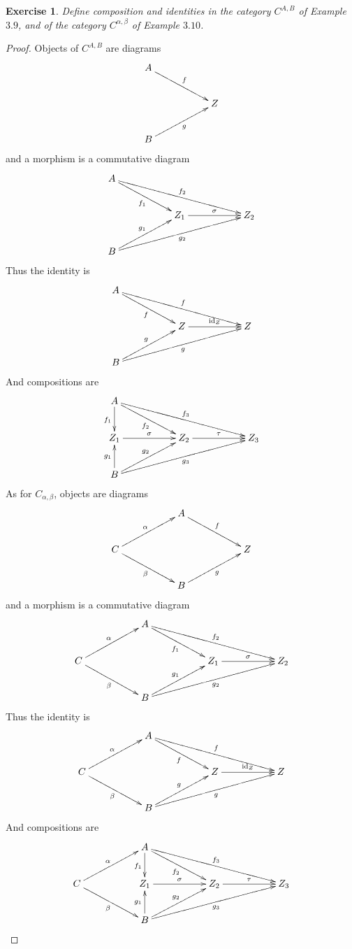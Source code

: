 \documentclass[a4paper, 11pt]{book}
\theoremstyle{plain}
\newtheorem{exercise}[theorem]{Exercise}
\theoremstyle{plain}
\begin{document}
\begin{exercise}
Define composition and identities in the category $C^{A,B}$ of Example $3.9$, and of the category $C^{\alpha,\beta}$ of Example $3.10$.
\end{exercise}
\begin{proof}
Objects of $C^{A,B}$ are diagrams
$$\xymatrix{
A\ar[rrd]^{f}& &\\
 & & Z\\
B\ar[rru]_g& &
}$$
and a morphism is a commutative diagram
$$\xymatrix{
A\ar[rrd]_{f_1}\ar[rrrrd]^{f_2} & & & & \\
& & Z_1\ar[rr]^{\sigma} & & Z_2\\
B\ar[rru]^{g_1}\ar[rrrru]_{g_2} & & & & 
}$$
Thus the identity is
$$\xymatrix{
A\ar[rrd]_{f}\ar[rrrrd]^{f} & & & & \\
& & Z\ar[rr]^{\text{id}_Z}& & Z\\
B\ar[rru]^{g}\ar[rrrru]_{g} & & & & 
}$$
And compositions are
$$\xymatrix{
A\ar[d]_{f_1}\ar[rrd]_{f_2}\ar[rrrrd]^{f_3} & & & & \\
Z_1\ar[rr]^\sigma & & Z_2\ar[rr]^{\tau} & & Z_3\\
B\ar[u]^{g_1}\ar[rru]^{g_2}\ar[rrrru]_{g_3} & & & & 
}$$
As for $C_{\alpha,\beta}$, objects are diagrams
$$\xymatrix{
& & A\ar[rrd]^{f}& &\\
C\ar[rru]^\alpha \ar[rrd]_\beta & & & & Z\\
& & B\ar[rru]_g& &
}$$
and a morphism is a commutative diagram
$$\xymatrix{
& & A\ar[rrd]_{f_1}\ar[rrrrd]^{f_2} & & & & \\
C\ar[rru]^\alpha\ar[rrd]_\beta & & & & Z_1\ar[rr]^{\sigma} & & Z_2\\
& & B\ar[rru]^{g_1}\ar[rrrru]_{g_2} & & & & 
}$$
Thus the identity is
$$\xymatrix{
& & A\ar[rrd]_{f}\ar[rrrrd]^{f} & & & & \\
C\ar[rru]^\alpha\ar[rrd]_\beta & & & & Z\ar[rr]^{\text{id}_Z}& & Z\\
& & B\ar[rru]^{g}\ar[rrrru]_{g} & & & & 
}$$
And compositions are
$$\xymatrix{
& & A\ar[d]_{f_1}\ar[rrd]_{f_2}\ar[rrrrd]^{f_3} & & & & \\
C\ar[rru]^\alpha\ar[rrd]_\beta & & Z_1\ar[rr]^\sigma & & Z_2\ar[rr]^{\tau} & & Z_3\\
& & B\ar[u]^{g_1}\ar[rru]^{g_2}\ar[rrrru]_{g_3} & & & & 
}$$
\end{proof}
\end{document}
